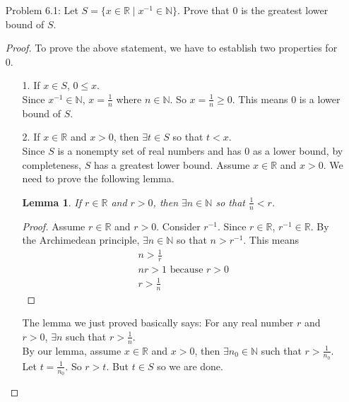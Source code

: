 \documentclass{article}
\theoremstyle{claim}
\newtheorem{lemma}[theorem]{Lemma}
\theoremstyle{definition}
\begin{document}
\begin{enumerate}
\begin{proof}
        \end{proof}
    \item[Problem 6.1:] Let $S = \{ x \in \mathbb{R} \mid x^{-1} \in \mathbb{N} \}$. Prove that $0$ is the greatest lower bound of $S$.
        \begin{proof}
            To prove the above statement, we have to establish two properties for $0$.
            \begin{enumerate}
                \item[1.] If $x \in S$, $0 \le x$.\\
                    Since $x^{-1} \in \mathbb{N}$, $x = \frac{1}{n}$ where $n \in \mathbb{N}$. So $x = \frac{1}{n} \ge 0$. This means $0$ is a lower bound of $S$.
                \item[2.] If $x \in \mathbb{R}$ and $x > 0$, then $\exists t \in S$ so that $t < x$.\\
                    Since $S$ is a nonempty set of real numbers and has $0$ as a lower bound, by completeness, $S$ has a greatest lower bound. Assume $x \in \mathbb{R}$ and $x > 0$. We need to prove the following lemma.
                    \begin{lemma}
                        If $r \in \mathbb{R}$ and $r > 0$, then $\exists n \in \mathbb{N}$ so that $\frac{1}{n} < r$.
                    \end{lemma}
                    \begin{proof}
                        Assume $r \in \mathbb{R}$ and $r > 0$. Consider $r^{-1}$. Since $r \in \mathbb{R}$, $r^{-1} \in \mathbb{R}$. By the Archimedean principle, $\exists n \in \mathbb{N}$ so that $n > r^{-1}$. This means
                        \begin{gather*}
                            n > \frac{1}{r}\\
                            nr > 1 \text{ because } r > 0\\
                            r > \frac{1}{n}
                        \end{gather*}
                    \end{proof}
                    The lemma we just proved basically says: For any real number $r$ and $r > 0$, $\exists n$ such that $r > \frac{1}{n}$. \\
                    By our lemma, assume $x \in \mathbb{R}$ and $x > 0$, then $\exists n_0 \in \mathbb{N}$ such that $r > \frac{1}{n_0}$. Let $t = \frac{1}{n_0}$. So $r > t$. But $t \in S$ so we are done.
            \end{enumerate}

\end{proof}
\end{enumerate}
\end{document}
